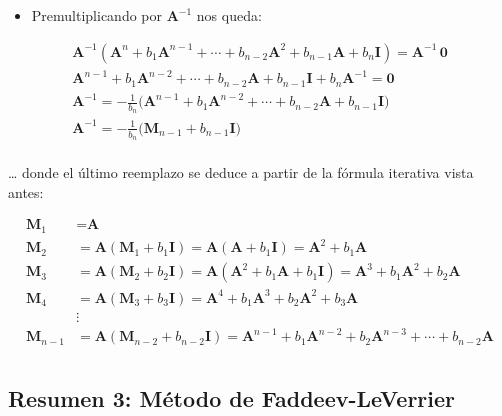\documentclass[openany]{book}
\providecommand{\tightlist}{%
  \setlength{\itemsep}{0pt}\setlength{\parskip}{0pt}}
\begin{document}
\begin{itemize}
\tightlist
\item
  Premultiplicando por \(\textbf{A}^{-1}\) nos queda:
\end{itemize}

\begin{gather*}
\textbf{A}^{-1} (\textbf{A}^n + b_1 \textbf{A}^{n-1} + \cdots + b_{n-2} \textbf{A}^2 + b_{n-1} \textbf{A} + b_n \textbf{I}) = \textbf{A}^{-1} \, \textbf{0} \\
\textbf{A}^{n-1} + b_1 \textbf{A}^{n-2} + \cdots + b_{n-2} \textbf{A} +b_{n-1} \textbf{I} + b_n \textbf{A}^{-1} = \textbf{0} \\
\textbf{A}^{-1} = - \frac{1}{b_n} \Big( \textbf{A}^{n-1} + b_1 \textbf{A}^{n-2} + \cdots + b_{n-2} \textbf{A} + b_{n-1} \textbf{I} \Big) \\
\textbf{A}^{-1} = - \frac{1}{b_n} \Big( \textbf{M}_{n-1} + b_{n-1} \textbf{I}  \Big) \\
\end{gather*}

\ldots{} donde el último reemplazo se deduce a partir de la fórmula iterativa vista antes:

\[
\begin{aligned}
\textbf{M}_1 &= \textbf{A}\\
\textbf{M}_2 &= \textbf{A} (\textbf{M}_{1} + b_{1} \textbf{I})  = \textbf{A} (\textbf{A} + b_{1} \textbf{I})= \textbf{A}^2 + b_{1} \textbf{A}\\
\textbf{M}_3 &= \textbf{A} (\textbf{M}_{2} + b_{2} \textbf{I})  = \textbf{A} (\textbf{A}^2 + b_{1} \textbf{A} + b_{1} \textbf{I})= \textbf{A}^3 + b_1 \textbf{A}^2 + b_{2} \textbf{A}\\
\textbf{M}_4 &= \textbf{A} (\textbf{M}_{3} + b_{3} \textbf{I}) = \textbf{A}^4 + b_1 \textbf{A}^3 + b_2 \textbf{A}^2 + b_{3} \textbf{A}\\
&\vdots \\
\textbf{M}_{n-1} &= \textbf{A} (\textbf{M}_{n-2} + b_{n-2} \textbf{I}) = \textbf{A}^{n-1} + b_1 \textbf{A}^{n-2} + b_2 \textbf{A}^{n-3} + \cdots + b_{n-2} \textbf{A}\\
\end{aligned}
\]

\hypertarget{resumen-3-muxe9todo-de-faddeev-leverrier}{%
\subsection*{Resumen 3: Método de Faddeev-LeVerrier}\label{resumen-3-muxe9todo-de-faddeev-leverrier}}
\end{document}

